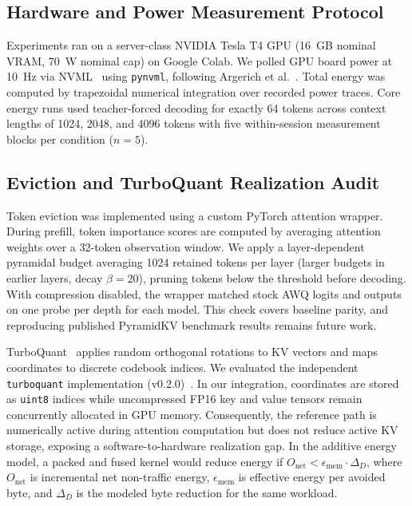 \documentclass[conference,a4paper]{IEEEtran}
\begin{document}
\subsection{Hardware and Power Measurement Protocol}
Experiments ran on a server-class NVIDIA Tesla T4 GPU (16~GB nominal VRAM, 70~W nominal cap) on Google Colab. We polled GPU board power at 10~Hz via NVML~\cite{nvidia2024nvml} using \texttt{pynvml}, following Argerich et al.~\cite{argerich_watt_2026}. Total energy was computed by trapezoidal numerical integration over recorded power traces. Core energy runs used teacher-forced decoding for exactly 64 tokens across context lengths of 1024, 2048, and 4096 tokens with five within-session measurement blocks per condition ($n=5$).

\subsection{Eviction and TurboQuant Realization Audit}
Token eviction was implemented using a custom PyTorch attention wrapper. During prefill, token importance scores are computed by averaging attention weights over a 32-token observation window. We apply a layer-dependent pyramidal budget averaging 1024 retained tokens per layer (larger budgets in earlier layers, decay $\beta=20$), pruning tokens below the threshold before decoding. With compression disabled, the wrapper matched stock AWQ logits and outputs on one probe per depth for each model. This check covers baseline parity, and reproducing published PyramidKV benchmark results remains future work.

TurboQuant~\cite{zandieh2026turboquant} applies random orthogonal rotations to KV vectors and maps coordinates to discrete codebook indices. We evaluated the independent \texttt{turboquant} implementation (v0.2.0)~\cite{back2matching_turboquant_v020}. In our integration, coordinates are stored as \texttt{uint8} indices while uncompressed FP16 key and value tensors remain concurrently allocated in GPU memory. Consequently, the reference path is numerically active during attention computation but does not reduce active KV storage, exposing a software-to-hardware realization gap. In the additive energy model, a packed and fused kernel would reduce energy if $O_\text{net} < \epsilon_\text{mem} \cdot \Delta_D$, where $O_\text{net}$ is incremental net non-traffic energy, $\epsilon_\text{mem}$ is effective energy per avoided byte, and $\Delta_D$ is the modeled byte reduction for the same workload.
\end{document}

